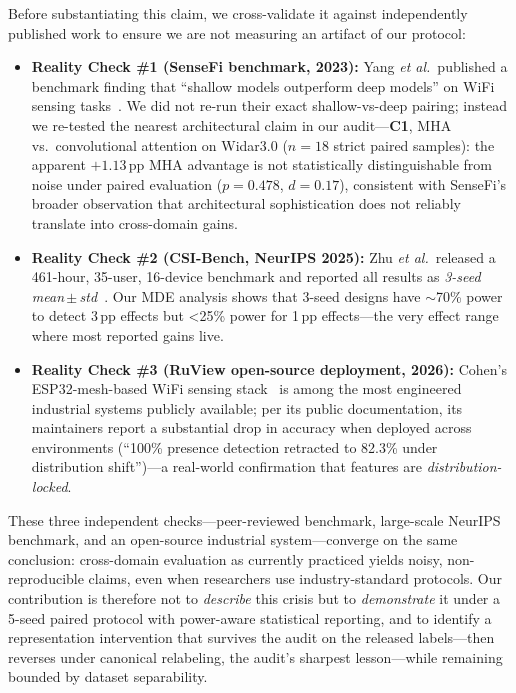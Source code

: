 \documentclass[journal,11pt]{IEEEtran}
\newcommand{\CSI}{\text{CSI}}
\newcommand{\etal}{\textit{et al.}}
\begin{document}
Before substantiating this claim, we cross-validate it against independently published work to ensure we are not measuring an artifact of our protocol:
\begin{itemize}
    \item \textbf{Reality Check \#1 (SenseFi benchmark, 2023):} Yang \etal\ published a benchmark finding that ``shallow models outperform deep models'' on WiFi sensing tasks~\cite{yang2023sensefi}. We did not re-run their exact shallow-vs-deep pairing; instead we re-tested the nearest architectural claim in our audit---\textbf{C1}, MHA vs.\ convolutional attention on Widar3.0 ($n = 18$ strict paired samples): the apparent $+1.13$\,pp MHA advantage is not statistically distinguishable from noise under paired evaluation ($p = 0.478$, $d = 0.17$), consistent with SenseFi's broader observation that architectural sophistication does not reliably translate into cross-domain gains.
    \item \textbf{Reality Check \#2 (CSI-Bench, NeurIPS 2025):} Zhu \etal\ released a 461-hour, 35-user, 16-device benchmark and reported all results as \emph{3-seed mean\,$\pm$\,std}~\cite{zhu2025csibench}. Our MDE analysis shows that 3-seed designs have $\sim$70\% power to detect 3\,pp effects but \textless 25\% power for 1\,pp effects---the very effect range where most reported gains live.
    \item \textbf{Reality Check \#3 (RuView open-source deployment, 2026):} Cohen's ESP32-mesh-based WiFi sensing stack~\cite{cohen2026ruview} is among the most engineered industrial systems publicly available; per its public documentation, its maintainers report a substantial drop in accuracy when deployed across environments (``100\% presence detection retracted to 82.3\% under distribution shift'')---a real-world confirmation that \CSI{} features are \emph{distribution-locked}.
\end{itemize}

These three independent checks---peer-reviewed benchmark, large-scale NeurIPS benchmark, and an open-source industrial system---converge on the same conclusion: \CSI{} cross-domain evaluation as currently practiced yields noisy, non-reproducible claims, even when researchers use industry-standard protocols. Our contribution is therefore not to \emph{describe} this crisis but to \emph{demonstrate} it under a 5-seed paired protocol with power-aware statistical reporting, and to identify a representation intervention that survives the audit on the released labels---then reverses under canonical relabeling, the audit's sharpest lesson---while remaining bounded by dataset separability.
\end{document}
